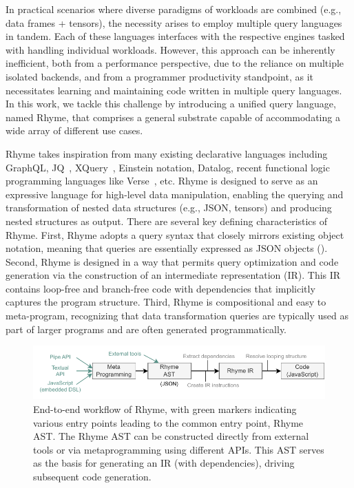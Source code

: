 \documentclass[runningheads]{llncs}
\newcommand{\lang}{Rhyme}
\begin{document}
In practical scenarios where diverse paradigms of workloads are combined
(e.g., data frames + tensors), the necessity arises to employ multiple
query languages in tandem.
Each of these languages interfaces with the respective engines tasked
with handling individual workloads.
However, this approach can be inherently inefficient, both from a performance
perspective, due to the reliance on multiple isolated backends, and from
a programmer productivity standpoint, as it necessitates learning and
maintaining code written in multiple query languages.
In this work, we tackle this challenge by introducing a unified query language, 
named \lang{},
that comprises a general substrate capable of accommodating a wide array of
different use cases.

\lang{} takes inspiration from many existing declarative languages
including GraphQL, JQ~\cite{jq}, XQuery~\cite{xquery}, Einstein notation,
Datalog, recent functional logic programming languages like Verse~\cite{verse}, etc.
\lang{} is designed to serve as an expressive language for high-level data
manipulation, enabling the querying and transformation of nested data structures
(e.g., JSON, tensors)
and producing nested structures as output.
There are several key defining characteristics of \lang{}.
First, \lang{} adopts a query syntax that closely mirrors existing object notation,
meaning that queries are essentially expressed as JSON objects ().
Second, \lang{} is designed in a way that permits query optimization and
code generation via the construction of an intermediate representation (IR).
This IR contains loop-free and branch-free code with dependencies that implicitly
captures the program structure.
Third, \lang{} is compositional and easy to meta-program, recognizing that data
transformation queries are typically used as part of larger programs and are often
generated programmatically.

\begin{figure}[t!]
\includegraphics[width=\textwidth]{images/intro_fig.pdf}
\caption{
End-to-end workflow of \lang{}, with green markers indicating various entry points
leading to the common entry point, \lang{} AST.
The \lang{} AST can be constructed directly from external tools or via metaprogramming
using different APIs.
This AST serves as the basis for generating an IR (with dependencies), driving
subsequent code generation.
}\label{fig:intro_overview}
\end{figure}
\end{document}
